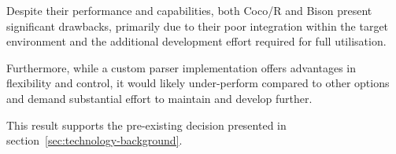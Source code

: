 Despite their performance and capabilities, both Coco/R and Bison present significant drawbacks, primarily due to their poor integration within the target environment and the additional development effort required for full utilisation. 

Furthermore, while a custom parser implementation offers advantages in flexibility and control, it would likely under-perform compared to other options and demand substantial effort to maintain and develop further.

This result supports the pre-existing decision presented in section~\ref{sec:technology-background}.

